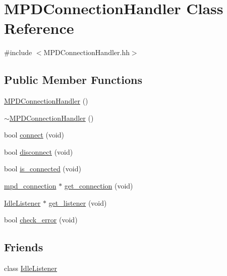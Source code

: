 \hypertarget{classMPDConnectionHandler}{
\section{\-M\-P\-D\-Connection\-Handler \-Class \-Reference}
\label{classMPDConnectionHandler}
}


{\ttfamily \#include $<$\-M\-P\-D\-Connection\-Handler.\-hh$>$}

\subsection*{\-Public \-Member \-Functions}
\begin{DoxyCompactItemize}
\item 
\hyperlink{classMPDConnectionHandler_abda5866e5062baf72dc2644fc700beda}{\-M\-P\-D\-Connection\-Handler} ()
\item 
\hyperlink{classMPDConnectionHandler_ae17f468b0865754332a5796b42e05ecc}{$\sim$\-M\-P\-D\-Connection\-Handler} ()
\item 
bool \hyperlink{classMPDConnectionHandler_a17a2e3a366999b3690901982a11b8117}{connect} (void)
\item 
bool \hyperlink{classMPDConnectionHandler_aebfcb4dfe430e99574ef2c0456d02ca4}{disconnect} (void)
\item 
bool \hyperlink{classMPDConnectionHandler_a651fc2b30f08e572980d540070213d09}{is\-\_\-connected} (void)
\item 
\hyperlink{includes_8hh_a83791b93fccbeae334f6cd9d4201e024}{mpd\-\_\-connection} $\ast$ \hyperlink{classMPDConnectionHandler_a1a67b4cce3a13f515ec9f8e9229503b9}{get\-\_\-connection} (void)
\item 
\hyperlink{classIdleListener}{\-Idle\-Listener} $\ast$ \hyperlink{classMPDConnectionHandler_ab4c4021acf4e043979606ed594ccfb53}{get\-\_\-listener} (void)
\item 
bool \hyperlink{classMPDConnectionHandler_a10833493ed0c4a3e9078d5f5f63d1009}{check\-\_\-error} (void)
\end{DoxyCompactItemize}
\subsection*{\-Friends}
\begin{DoxyCompactItemize}
\item 
class \hyperlink{classMPDConnectionHandler_a227a2ce158de0cd04bf5cfbb1ff9be9c}{\-Idle\-Listener}
\end{DoxyCompactItemize}


